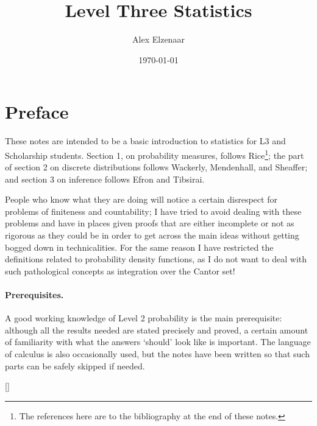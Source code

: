 \documentclass[a4paper,leqno]{article}
\title{Level Three Statistics}
\author{Alex Elzenaar}
\date{\today}
\numberwithin{equation}{section}
\theoremstyle{definition}
\theoremstyle{remark}
\begin{document}
\maketitle
\tableofcontents
\section*{Preface}
These notes are intended to be a basic introduction to statistics for L3 and Scholarship students. Section 1, on probability measures, follows
Rice\footnote{The references here are to the bibliography at the end of these notes.}; the part of section 2 on discrete distributions follows Wackerly, Mendenhall,
and Sheaffer; and section 3 on inference follows Efron and Tibsirai.

People who know what they are doing will notice a certain disrespect for problems of finiteness and countability; I have tried to avoid dealing
with these problems and have in places given proofs that are either incomplete or not as rigorous as they could be in order to get across the
main ideas without getting bogged down in technicalities. For the same reason I have restricted the definitions related to probability density
functions, as I do not want to deal with such pathological concepts as integration over the Cantor set!

\paragraph{Prerequisites.} A good working knowledge of Level 2 probability is the main prerequisite: although all the results needed are stated
precisely and proved, a certain amount of familiarity with what the answers `should' look like is important. The language of calculus is also
occasionally used, but the notes have been written so that such parts can be safely skipped if needed.

[{\titlerule[0.8pt]}]
\let\oldsection\section
\renewcommand\section{\clearpage\oldsection}
\end{document}

